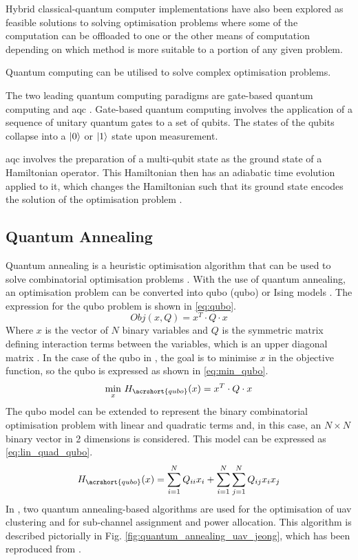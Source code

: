Hybrid classical-quantum computer implementations have also been explored as feasible solutions to solving optimisation problems where some of the computation can be offloaded to one or the other means of computation depending on which method is more suitable to a portion of any given problem. 

Quantum computing can be utilised to solve complex optimisation problems. 

The two leading quantum computing paradigms are gate-based quantum computing and \acrfull{aqc} \cite{yarkoni_quantum_2022}. Gate-based quantum computing involves the application of a sequence of unitary quantum gates to a set of qubits. The states of the qubits collapse into a $\ket{0}$ or $\ket{1}$ state upon measurement. 

\acrshort{aqc} involves the preparation of a multi-qubit state as the ground state of a Hamiltonian operator. This Hamiltonian then has an adiabatic time evolution applied to it, which changes the Hamiltonian such that its ground state encodes the solution of the optimisation problem \cite{yarkoni_quantum_2022}. 
\subsection{Quantum Annealing}
Quantum annealing is a heuristic optimisation algorithm that can be used to solve combinatorial optimisation problems \cite{yarkoni_quantum_2022}.
With the use of quantum annealing, an optimisation problem can be converted into \acrlong{qubo} (\acrshort{qubo}) or Ising models \cite{jeong_quantum_2025}.
The expression for the \acrshort{qubo} problem is shown in \ref{eq:qubo}.
\begin{equation} \label{eq:qubo}
        Obj(x, Q) = x^T \cdot Q \cdot x
\end{equation}
Where $x$ is the vector of $N$ binary variables and $Q$ is the symmetric matrix defining interaction terms between the variables, which is an upper diagonal matrix  \cite{jeong_quantum_2025, yarkoni_quantum_2022}. 
In the case of the \acrshort{qubo} in \cite{jeong_quantum_2025}, the goal is to minimise $x$ in the objective function, so the \acrshort{qubo} is expressed as shown in \ref{eq:min_qubo}.
\begin{equation} \label{eq:min_qubo}
    \underset{x}{\min}\ H_{\acrshort{qubo}}(x) = x^{T} \cdot Q \cdot x
\end{equation}
The \acrshort{qubo} model can be extended to represent the binary combinatorial optimisation problem with linear and quadratic terms and, in this case, an $N \times N$ binary vector in 2 dimensions is considered. This model can be expressed as \ref{eq:lin_quad_qubo}. 
\begin{equation} \label{eq:lin_quad_qubo}
    H_{\acrshort{qubo}}(x) = \sum_{i=1}^{N} Q_{ii}x_{i} + \sum_{i=1}^{N}\sum_{j=1}^{N} Q_{ij} x_{i} x_{j}
\end{equation} 
In \cite{jeong_quantum_2025}, two quantum annealing-based algorithms are used for the optimisation of \acrshort{uav} clustering and for sub-channel assignment and power allocation. This algorithm is described pictorially in Fig. \ref{fig:quantum_annealing_uav_jeong}, which has been reproduced from \cite{jeong_quantum_2025}. 

